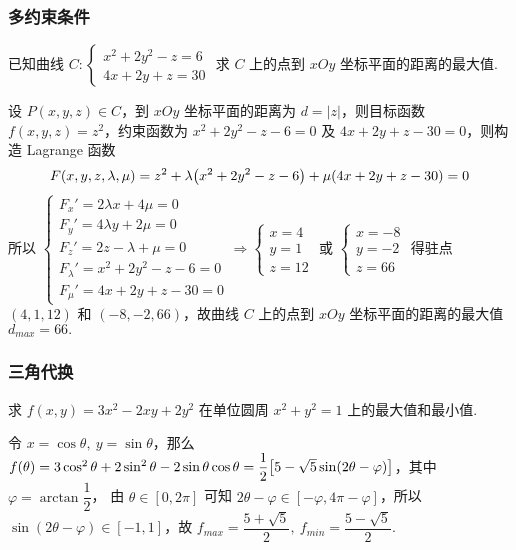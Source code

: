 \subsubsection{多约束条件}

\begin{example}[2019 数一]
    已知曲线 $C:\begin{cases}
        x^2+2y^2-z=6\\
        4x+2y+z=30
    \end{cases}$ 求 $C$ 上的点到 $xOy$ 坐标平面的距离的最大值.
\end{example}
\begin{solution}
    设 $P(x,y,z)\in C$，到 $xOy$ 坐标平面的距离为 $d=|z|$，则目标函数 $f(x,y,z)=z^2$，约束函数为 $x^2+2y^2-z-6=0$ 及 $4x+2y+z-30=0$，则构造 Lagrange 函数
    $$F(x,y,z,\lambda,\mu)=z^2+\lambda\qty(x^2+2y^2-z-6)+\mu\qty(4x+2y+z-30)=0$$
    所以 $\begin{cases}
        F_x'=2\lambda x+4\mu=0\\
        F_y'=4\lambda y+2\mu=0\\
        F_z'=2z-\lambda+\mu=0\\
        F_\lambda'=x^2+2y^2-z-6=0\\
        F_\mu'=4x+2y+z-30=0
    \end{cases}\Rightarrow \begin{cases}
        x=4\\
        y=1\\
        z=12
    \end{cases}\text{ 或 }\begin{cases}
        x=-8\\
        y=-2\\
        z=66
    \end{cases}$ 得驻点 $(4,1,12)$ 和 $(-8,-2,66)$，故曲线 $C$ 上的点到 $xOy$ 坐标平面的距离的最大值 $d_{max}=66.$
\end{solution}

\subsubsection{三角代换}

\begin{example}
    求 $f(x,y)=3x^2-2xy+2y^2$ 在单位圆周 $x^2+y^2=1$ 上的最大值和最小值.
\end{example}
\begin{solution}
    令 $x=\cos\theta,~y=\sin\theta$，那么 $f(\theta)=3\cos^2\theta+2\sin^2\theta-2\sin \theta\cos\theta=\dfrac{1}{2}\qty[5-\sqrt{5}\sin(2\theta-\varphi)]$，其中 $\varphi=\arctan\dfrac{1}{2}$，
    由 $\theta\in[0,2\pi]$ 可知 $2\theta-\varphi\in[-\varphi,4\pi-\varphi]$，所以 $\sin(2\theta-\varphi)\in[-1,1]$，故 $f_{max}=\dfrac{5+\sqrt{5}}{2},~f_{min}=\dfrac{5-\sqrt{5}}{2}.$
\end{solution}

